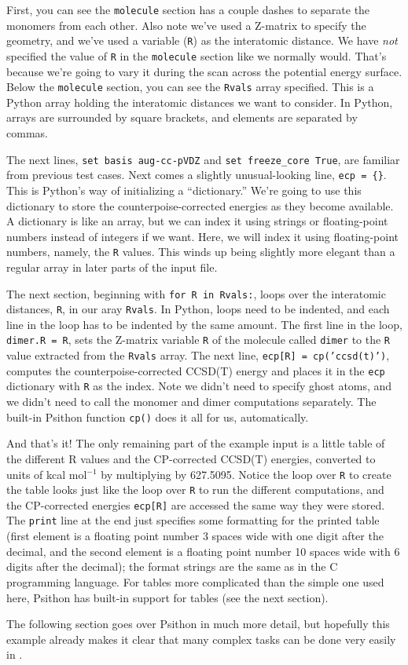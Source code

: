 First, you can see the {\tt molecule} section has a couple dashes to
separate the monomers from each other.  Also note we've used a Z-matrix to
specify the geometry, and we've used a variable ({\tt R}) as the
interatomic distance.  We have {\em not} specified the value of {\tt R} in
the {\tt molecule} section like we normally would.  That's because we're
going to vary it during the scan across the potential energy surface.
Below the {\tt molecule} section, you can see the {\tt Rvals} array
specified.  This is a Python array holding the interatomic distances we
want to consider.  In Python, arrays are surrounded by square brackets, and
elements are separated by commas.

The next lines, {\tt set basis aug-cc-pVDZ} and {\tt set freeze\_core
True}, are familiar from previous test cases.  Next comes a slightly
unusual-looking line, {\tt ecp = \{\}}.  This is Python's way of initializing
a ``dictionary.''  We're going to use this dictionary to store the
counterpoise-corrected energies as they become available.  A dictionary is
like an array, but we can index it using strings or floating-point numbers
instead of integers if we want.  Here, we will index it using
floating-point numbers, namely, the {\tt R} values.  This winds up being
slightly more elegant than a regular array in later parts of the input
file.

The next section, beginning with {\tt for R in Rvals:}, loops over the
interatomic distances, {\tt R}, in our aray {\tt Rvals}.  In Python,
loops need to be indented, and each line in the loop has to be indented
by the same amount.  The first line in the loop, {\tt dimer.R = R},
sets the Z-matrix variable {\tt R} of the molecule called {\tt dimer}
to the {\tt R} value extracted from the {\tt Rvals} array.  The next line,
{\tt ecp[R] = cp('ccsd(t)')}, computes the counterpoise-corrected
CCSD(T) energy and places it in the {\tt ecp} dictionary with {\tt R} as
the index.  Note we didn't need to specify ghost atoms, and we didn't need
to call the monomer and dimer computations separately.  The built-in
Psithon function {\tt cp()} does it all for us, automatically.

And that's it!  The only remaining part of the example input is a little
table of the different R values and the CP-corrected CCSD(T) energies,
converted to units of kcal mol$^{-1}$ by multiplying by 627.5095.  Notice
the loop over {\tt R} to create the table looks just like the loop over
{\tt R} to run the different computations, and the CP-corrected energies 
{\tt ecp[R]} are accessed the same way they were stored.  The {\tt print}
line at the end just specifies some formatting for the printed table (first
element is a floating point number 3 spaces wide with one digit after the
decimal, and the second element is a floating point number 10 spaces wide
with 6 digits after the decimal); the format strings are the same as in the
C programming language.  For tables more complicated than the simple one
used here, Psithon has built-in support for tables (see the next section).

The following section goes over Psithon in much more detail, but
hopefully this example already makes it clear that many complex tasks
can be done very easily in \PSIfour.

